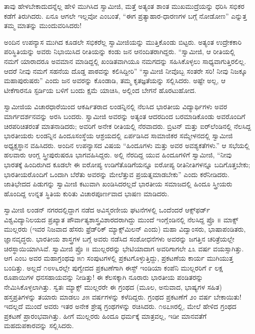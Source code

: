 ತಾವು ಹೇಳಬೇಕಾದುದನ್ನೆಲ್ಲ ಹೇಳಿ ಮುಗಿಸಿದ ಸ್ವಾಮೀಜಿ, ಮತ್ತೆ ಅತ್ಯಂತ ಶಾಂತ ಮುಖಮುದ್ರೆಯನ್ನು ಧರಿಸಿ ಸಭಿಕರ ಕಡೆಗೆ ತಿರುಗಿದರು. ಏನೂ ಆಗಲೇ ಇಲ್ಲವೋ ಎಂಬಂತೆ, “ಈಗ ಪ್ರತ್ಯಾಹಾರ-ಧಾರಣಗಳ ಬಗ್ಗೆ ನೋಡೋಣ” ಎನ್ನುತ್ತ ತಮ್ಮ ಮಾತನ್ನು ಮುಂದುವರಿಸಿದರು!

ಅಂದಿನ ಉಪನ್ಯಾಸ ಮುಗಿದ ಕೂಡಲೇ ಸಭಿಕರೆಲ್ಲ ಸ್ವಾಮೀಜಿಯನ್ನು ಮುತ್ತಿಕೊಂಡು ಬಿಟ್ಟರು. ಅತ್ಯಂತ ಉದ್ರೇಕಕಾರಿ ಪರಿಸ್ಥಿತಿಯನ್ನು ಅವರು ನಿಭಾಯಿಸಿದ ರೀತಿಯನ್ನು ಕಂಡು ಜನ ಆನಂದಿತರಾಗಿದ್ದರು. “ಸ್ವಾಮೀಜಿ, ಆ ರೀತಿಯಲ್ಲಿ ನಮಗೆ ಯಾರಾದರೂ ಅವಮಾನ ಮಾಡಿದ್ದಲ್ಲಿ ಖಂಡಿತವಾಗಿಯೂ ನಮಗದನ್ನು ಸಹಿಸಿಕೊಳ್ಳಲು ಸಾಧ್ಯವಾಗುತ್ತಿರಲಿಲ್ಲ. ಆದರೆ ನೀವು ನಮಗೆ ಸಹನೆಯ ದೊಡ್ಡ ಪಾಠವನ್ನು ಕಲಿಸಿದ್ದೀರಿ” “ಸ್ವಾಮೀಜಿ ನೀವೊಬ್ಬ ಸಂತರೇ ಸರಿ! ನೀವು ನಿಜಕ್ಕೂ ಮಹಾಪುರುಷರು” ಎಂದು ಜನ ಅವರನ್ನು ಕೊಂಡಾಡಿ, ತಮ್ಮ ಕೃತಜ್ಞತೆಯನ್ನು ಸಲ್ಲಿಸಿದರು. ಅಷ್ಟೇ ಅಲ್ಲ, ಆ ಟೀಕೆಗಾರನೂ ಸ್ಟರ್ಡಿಯ ಬಳಿಗೆ ಬಂದು ಕ್ಷಮೆ ಯಾಚಿಸಿ, ಅಲ್ಲಿಂದ ಬೇಗನೆ ಹೊರಟುಹೋದ.

ಸ್ವಾಮೀಜಿಯ ವಿಚಾರಧಾರೆಯಿಂದ ಆಕರ್ಷಿತರಾದ ಲಂಡನ್ನಿನಲ್ಲಿ ನೆಲಸಿದ ಭಾರತೀಯ ವಿದ್ಯಾರ್ಥಿಗಳು ಅವರ ಮಾರ್ಗದರ್ಶನವನ್ನು ಅರಸಿ ಬಂದರು. ಸ್ವಾಮೀಜಿ ಅವರನ್ನು ಅತ್ಯಂತ ಆದರದಿಂದ ಬರಮಾಡಿಕೊಂಡು ಅವರೊಂದಿಗೆ ಚಿರಪರಿಚಿತರಂತೆ ಮಾತನಾಡಿದರು; ಅವರಿಗೆ ಅನೇಕ ರೀತಿಯಲ್ಲಿ ನೆರವಾದರು. ಬ್ರಿಟನ್ ಮತ್ತು ಐರ್​ಲೆಂಡಿನಲ್ಲಿ ನೆಲಸಿದ್ದ ಭಾರತೀಯರು ಲಂಡನ್ನಿನ ಹಿಂದೂಸಂಸ್ಥೆಯ ಆಶ್ರಯದಲ್ಲಿ ಏರ್ಪಡಿಸಿದ ಸಾಮಾಜಿಕರ ಸಮ್ಮೇಳನದಲ್ಲಿ ಸ್ವಾಮೀಜಿ ಅಧ್ಯಕ್ಷಸ್ಥಾನ ವಹಿಸಿದರು. ಅಂದಿನ ಉಪನ್ಯಾಸದ ವಿಷಯ “ಹಿಂದೂಗಳು ಮತ್ತು ಅವರ ಅವಶ್ಯಕತೆಗಳು.” ಆ ಸಭೆಯಲ್ಲಿ ಹಲವಾರು ಆಂಗ್ಲ ಸ್ತ್ರೀಪುರುಷರೂ ಭಾಗವಹಿಸಿದ್ದರು. ಅಲ್ಲಿ ನೆರದಿದ್ದ ಯುವ ಹಿಂದೂಗಳಿಗೆ ಸ್ವಾಮೀಜಿ, “ನೀವು ಭಾರತಕ್ಕೆ ಹಿಂದಿರುಗಿದ ಕೂಡಲೇ ಈ ಐರೋಪ್ಯ ಉಡಿಗೆತೊಡಿಗೆಯನ್ನೂ ಐರೋಪ್ಯ ರೀತಿನೀತಿಗಳನ್ನೂ ಬದಿಗೊತ್ತಬೇಕು; ಭಾರತೀಯರೊಂದಿಗೆ ಒಂದಾಗಿ ಬೆರೆತು ಅವರನ್ನು ಮೇಲೆತ್ತುವ ಪ್ರಯತ್ನಮಾಡಬೇಕು” ಎಂದು ಕರೆನೀಡಿದರು. ಜಾತಿಭೇದದ ಪಿಡುಗನ್ನು ಸ್ವಾಮೀಜಿ ಕಟುವಾಗಿ ಖಂಡಿಸಿದರಲ್ಲದೆ ಭಾರತೀಯ ಸಮಾಜದಲ್ಲಿ ಹಿಂದೂ ಸ್ತ್ರೀಯರು ಹೊಂದಿದ್ದ ಉನ್ನತ ಸ್ಥಿತಿಯ ಕುರಿತು ವಿಚಾರಪೂರ್ಣವಾದ ಭಾಷಣ ಮಾಡಿದರು.

ಸ್ವಾಮೀಜಿ ಲಂಡನ್ ನಗರದಲ್ಲಿದ್ದಾಗ ನಡೆದ ಅವಿಸ್ಮರಣೀಯ ಘಟನೆಗಳಲ್ಲಿ ಒಂದೆಂದರೆ ಆಕ್ಸ್​ಫರ್ಡ್ ವಿಶ್ವವಿದ್ಯಾನಿಲಯದ ಪ್ರಖ್ಯಾತ ಪೌರ್ವಾತ್ಯಶಾಸ್ತ್ರವಿಶಾರದರಾಗಿದ್ದು ಮುಂದೆ ಇಂಗ್ಲೆಂಡಿನಲ್ಲಿ ನೆಲಸಿದ್ದ ಪ್ರೊ ॥ ಮಾಕ್ಸ್ ಮುಲ್ಲರರು (ಇವರ ನಿಜವಾದ ಹೆಸರು ಫ್ರೆಡ್​ರಿಕ್ ಮ್ಯಾಕ್ಸ್​ಮಿಲನ್ ಎಂದು) ಮಹಾ ವಿದ್ವಾಂಸರು, ಭಾಷಾಪಂಡಿತರು, ಜ್ಞಾನವೃದ್ಧರು. ಭಾರತೀಯ ಶಾಸ್ತ್ರಗಳ ಬಗ್ಗೆ ಅವರು ನಡೆಸಿದ ಸಂಶೋಧನೆಗಳು ಅವರನ್ನು ಜಗತ್ತಿನ ಚರಿತ್ರೆಯಲ್ಲೇ ಚಿರಸ್ಥಾಯಿಯಾಗಿಸಿವೆ. ಸ್ವಾಮೀಜಿ ಪ್ರೊ ॥ ಮುಲ್ಲರರನ್ನು ಭೇಟಿಯಾದಾಗ ಅವರಿಗಾಗಲೇ ೭೩ ವರ್ಷ ವಯಸ್ಸಾಗಿತ್ತು. ಆಗ  ಎಂಬ ಅವರ ಮಹಾಗ್ರಂಥವು ೫೧ ಸಂಪುಟಗಳಲ್ಲಿ ಪ್ರಕಟಗೊಳ್ಳುತ್ತಿದ್ದು, ಪ್ರಕಟಣೆಯ ಕಾರ್ಯ ಮುಗಿಯುತ್ತ ಬಂದಿತ್ತು. ಅಲ್ಲದೆ ೧೮೪೬ರಲ್ಲೇ ಪುಗ್ವೇದದ ಪ್ರಕಟಣೆಗಾಗಿ ಈಸ್ಟ್ ಇಂಡಿಯಾ ಕಂಪೆನಿ ಮುಲ್ಲರರಿಗೆ ೯ ಲಕ್ಷ ರೂಪಾಯಿಗಳ ಧನಸಹಾಯವನ್ನು ನೀಡಿತ್ತು! ಈ ಕೆಲಸಕ್ಕಾಗಿ ನೂರಾರು ಭಾರತೀಯ ಪಂಡಿತರನ್ನು ನೇಮಿಸಿಕೊಳ್ಳಲಾಗಿತ್ತು. ಸ್ವತಃ ಮ್ಯಾಕ್ಸ್ ಮುಲ್ಲರರೇ ಈ ಗ್ರಂಥದ (ಮೂಲ, ಅನುವಾದ, ಭಾಷ್ಯಗಳ ಸಹಿತ) ಹಸ್ತಪ್ರತಿಗಳನ್ನು ತಯಾರು ಮಾಡಲು ೨೫ ವರ್ಷಗಳನ್ನು ಕಳೆದಿದ್ದರು. ಗ್ರಂಥದ ಪ್ರಕಟಣೆಗೆ ೨ಂ ವರ್ಷ ಬೇಕಾಯಿತು! ಇದಲ್ಲದೆ ಮುಂದೆ ಅವರು ಇತರ ಅನೇಕ ಶ್ರೇಷ್ಠ ಗ್ರಂಥಗಳನ್ನು ರಚಿಸಿದರು. ೧೮೭೫ರಲ್ಲಿ, ಮೇಲೆ ಹೇಳಿದ  ಗ್ರಂಥದ ಪ್ರಕಟಣೆ ಪ್ರಾರಂಭವಾಗಿತ್ತು. ಹೀಗೆ ಮುಲ್ಲರರು ಹಿಂದೂ ಧರ್ಮಕ್ಕೆ ಮಾತ್ರವಲ್ಲ, ಇಡೀ ಮಾನವತೆಗೆ ಮಹದುಪಕಾರವನ್ನು ಸಲ್ಲಿಸಿದರು.

